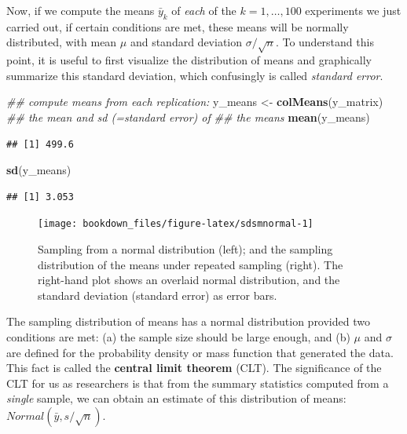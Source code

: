 \documentclass[12pt,]{krantz}
\newenvironment{Shaded}{\begin{snugshade}}{\end{snugshade}}
\newcommand{\CommentTok}[1]{\textcolor[rgb]{0.56,0.35,0.01}{\textit{#1}}}
\newcommand{\KeywordTok}[1]{\textcolor[rgb]{0.13,0.29,0.53}{\textbf{#1}}}
\newcommand{\NormalTok}[1]{#1}
\newcommand{\StringTok}[1]{\textcolor[rgb]{0.31,0.60,0.02}{#1}}
\begin{document}
Now, if we compute the means \(\bar{y}_k\) of \emph{each} of the \(k=1,\dots,100\) experiments we just carried out, if certain conditions are met, these means will be normally distributed, with mean \(\mu\) and standard deviation \(\sigma/\sqrt{n}\). To understand this point, it is useful to first visualize the distribution of means and graphically summarize this standard deviation, which confusingly is called \emph{standard error}.

\begin{Shaded}
\begin{Highlighting}[]
\CommentTok{## compute means from each replication:}
\NormalTok{y_means <-}\StringTok{ }\KeywordTok{colMeans}\NormalTok{(y_matrix)}
\CommentTok{## the mean and sd (=standard error) of}
\CommentTok{## the means}
\KeywordTok{mean}\NormalTok{(y_means)}
\end{Highlighting}
\end{Shaded}

\begin{verbatim}
## [1] 499.6
\end{verbatim}

\begin{Shaded}
\begin{Highlighting}[]
\KeywordTok{sd}\NormalTok{(y_means)}
\end{Highlighting}
\end{Shaded}

\begin{verbatim}
## [1] 3.053
\end{verbatim}

\begin{figure}
\texttt{[image: bookdown\_files/figure-latex/sdsmnormal-1]} \caption{Sampling from a normal distribution (left); and the sampling distribution of the means under repeated sampling (right). The right-hand plot shows an overlaid normal distribution, and the standard deviation (standard error) as error bars.}\label{fig:sdsmnormal}
\end{figure}

The sampling distribution of means has a normal distribution provided two conditions are met: (a) the sample size should be large enough, and (b) \(\mu\) and \(\sigma\) are defined for the probability density or mass function that generated the data. This fact is called the \textbf{central limit theorem} (CLT). The significance of the CLT for us as researchers is that from the summary statistics computed from a \emph{single} sample, we can obtain an estimate of this distribution of means: \(Normal(\bar{y},s/\sqrt{n})\).
\end{document}
